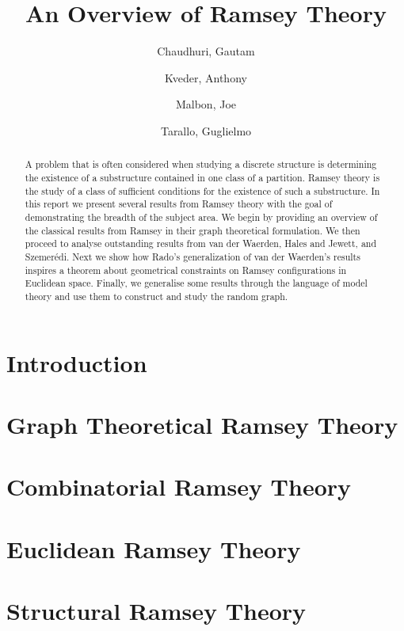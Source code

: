 \documentclass{article}
\title{An Overview of Ramsey Theory}
\author{
  Chaudhuri, Gautam\\
  \and
  Kveder, Anthony\\
  \and
  Malbon, Joe\\
  \and
  Tarallo, Guglielmo\\
}
\theoremstyle{BreakBold}
\theoremstyle{example}
\theoremstyle{definition}
\begin{document}
\begin{titlingpage}
\maketitle
\begin{abstract}
  A problem that is often considered when studying a discrete structure is
  determining the existence of a substructure contained in one class of a partition.
  Ramsey theory is the study of a class of sufficient conditions for the
  existence of such a substructure.
  In this report we present several results from Ramsey theory with the goal of
  demonstrating the breadth of the subject area.
  We begin by providing an overview of the classical results from Ramsey in
  their graph theoretical formulation.
  We then proceed to analyse outstanding results from van der Waerden, Hales
  and Jewett, and Szemerédi.
  Next we show how Rado's generalization of van der Waerden's results inspires 
  a theorem about geometrical constraints on Ramsey configurations in Euclidean space.
  Finally, we generalise some results through the language of model theory and
  use them to construct and study the random graph.
\end{abstract}
\tableofcontents
  
\end{titlingpage}

\section*{Introduction}\label{sec:0}


\newpage
\section{Graph Theoretical Ramsey Theory}\label{sec:1}


\newpage
\section{Combinatorial Ramsey Theory}\label{sec:2}


\newpage
\section{Euclidean Ramsey Theory}\label{sec:3}


\newpage
\section{Structural Ramsey Theory}\label{sec:4}


\printbibliography{}
\end{document}
